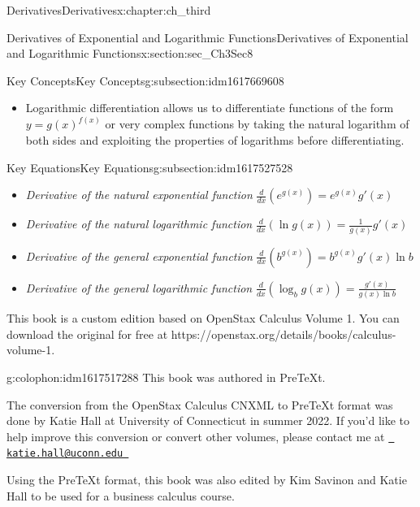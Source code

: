 \documentclass[oneside,10pt,]{book}
\numberwithin{equation}{section}
\providecommand\phantomsection{}
\begin{document}
\begin{chapterptx}{Derivatives}{}{Derivatives}{}{}{x:chapter:ch_third}
\begin{sectionptx}{Derivatives of Exponential and Logarithmic Functions}{}{Derivatives of Exponential and Logarithmic Functions}{}{}{x:section:sec_Ch3Sec8}
\begin{subsectionptx}{Key Concepts}{}{Key Concepts}{}{}{g:subsection:idm1617669608}
\begin{itemize}[label=\textbullet]
\item{}Logarithmic differentiation allows us to differentiate functions of the form \(y=g(x)^{f(x)}\) or very complex functions by taking the natural logarithm of both sides and exploiting the properties of logarithms before differentiating.%
\end{itemize}
\end{subsectionptx}
%
%
\typeout{************************************************}
\typeout{************************************************}
%
\begin{subsectionptx}{Key Equations}{}{Key Equations}{}{}{g:subsection:idm1617527528}
%
\begin{itemize}[label=\textbullet]
\item{}\emph{Derivative of the natural exponential function} \(\frac{d}{dx}(e^{g(x)})=e^{g(x)}g'(x)\)%
\item{}\emph{Derivative of the natural logarithmic function} \(\frac{d}{dx}(\ln  g(x))=\frac{1}{g(x)}g'(x)\)%
\item{}\emph{Derivative of the general exponential function} \(\frac{d}{dx}(b^{g(x)})=b^{g(x)}g'(x) \ln  b\)%
\item{}\emph{Derivative of the general logarithmic function} \(\frac{d}{dx}(\log_bg(x))=\frac{g'(x)}{g(x) \ln  b}\)%
\end{itemize}
\end{subsectionptx}
This book is a custom edition based on OpenStax Calculus Volume 1. You can download the original for free at https:\slash{}\slash{}openstax.org\slash{}details\slash{}books\slash{}calculus-volume-1.%
\end{sectionptx}
\end{chapterptx}
%
\backmatter%
%
\clearpage\phantomsection%
%
\clearpage
\pagestyle{empty}
\begin{backcolophon}{g:colophon:idm1617517288}%
This book was authored in PreTeXt.%
\par
The conversion from the OpenStax Calculus CNXML to  PreTeXt format was done by Katie Hall at University of Connecticut in summer 2022. If you'd like to help improve this conversion or convert other volumes, please contact me at \href{mailto: katie.hall@uconn.edu }{\nolinkurl{ katie.hall@uconn.edu }}%
\par
Using the PreTeXt format, this book was also edited by Kim Savinon and Katie Hall to be used for a business calculus course.%
\end{backcolophon}%
\end{document}
